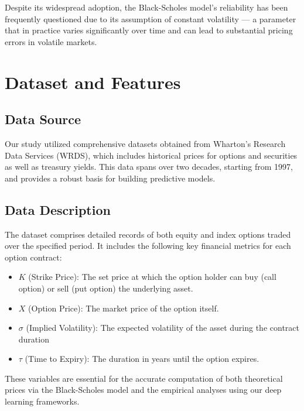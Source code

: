 \documentclass[10pt]{article}
\begin{document}
Despite its widespread adoption, the Black-Scholes model's reliability has been frequently questioned due to its assumption of constant volatility\cite{jankova2018drawbacks} — a parameter that in practice varies significantly over time and can lead to substantial pricing errors in volatile markets.

\section{Dataset and Features}

\subsection{Data Source}

Our study utilized comprehensive datasets obtained from Wharton's Research Data Services (WRDS)\cite{wachowicz2020wharton}, which includes historical prices for options and securities as well as treasury yields. This data spans over two decades, starting from 1997, and provides a robust basis for building predictive models.

\subsection{Data Description}
The dataset comprises detailed records of both equity and index options traded over the specified period. It includes the following key financial metrics for each option contract:

\begin{itemize}
    \item \(K\) (Strike Price): The set price at which the option holder can buy (call option) or sell (put option) the underlying asset.
    \item \(X\) (Option Price): The market price of the option itself.
    \item \(\sigma\) (Implied Volatility): The expected volatility of the asset during the contract duration
    \item \(\tau\) (Time to Expiry): The duration in years until the option expires.
\end{itemize}

These variables are essential for the accurate computation of both theoretical prices via the Black-Scholes model and the empirical analyses using our deep learning frameworks.
\end{document}
